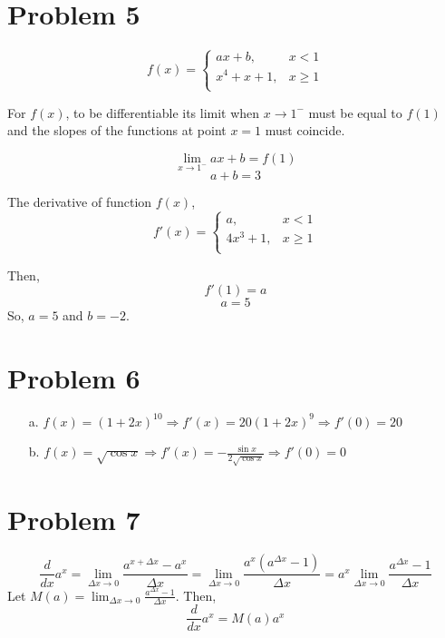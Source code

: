 \documentclass{article}
\begin{document}
\section{Problem 5}
\[f(x)=
    \left\{
      \begin{array}{ll}
      ax+b, & x < 1 \\
      x^4+x+1, & x \geq 1 \\
      \end{array} 
      \right.
    \]

For $f(x)$, to be differentiable its limit when $x \to 1^{-}$ must be equal to $f(1)$ and the slopes of the functions at point $x = 1$ must coincide.

\[ \lim_{x \to 1^{-}} ax+b  = f(1)\]
\[ a+b = 3 \]

The derivative of function $f(x)$, 
\[f'(x)=
    \left\{
      \begin{array}{ll}
      a, & x < 1 \\
      4x^3+1, & x \geq 1 \\
      \end{array} 
      \right.
\]

Then,
\[ f'(1) = a \]
\[ a = 5\]
So, $a = 5$ and $b = -2$.

\section{Problem 6}
\begin{itemize}
    \item[a.] $f(x) = (1+2x)^{10} \Rightarrow f'(x) = 20(1+2x)^9 \Rightarrow f'(0) = 20$
    \item[b.] $f(x) = \sqrt{\cos{x}} \Rightarrow f'(x) = -\frac{\sin{x}}{2\sqrt{\cos{x}}} \Rightarrow f'(0) = 0$ 
\end{itemize}

\section{Problem 7}
\[ \frac{d}{dx} a^x = \lim_{\Delta x \to 0} \frac{a^{x+\Delta x} - a^x}{\Delta x} = \lim_{\Delta x \to 0} \frac{a^{x}\left(a^{\Delta x} - 1 \right)}{\Delta x} = a^x \lim_{\Delta x \to 0} \frac{a^{\Delta x} - 1}{\Delta x} \]
Let $M(a) = \lim_{\Delta x \to 0} \frac{a^{\Delta x} - 1}{\Delta x}$. Then,
\[ \frac{d}{dx} a^x = M(a)a^x \]
\end{document}
